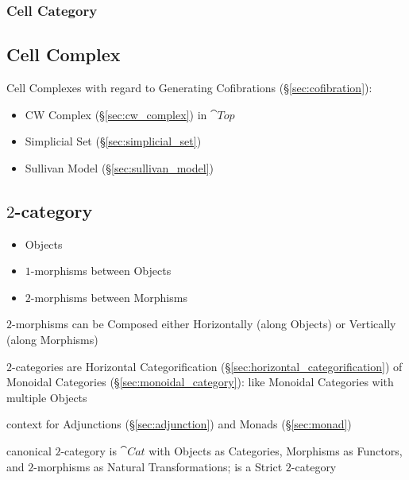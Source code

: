 \subsubsection{Cell Category}\label{sec:cell_category}



\subsection{Cell Complex}\label{sec:cell_complex}

Cell Complexes with regard to Generating Cofibrations
(\S\ref{sec:cofibration}):
\begin{itemize}
\item CW Complex (\S\ref{sec:cw_complex}) in $\cat{Top}$
\item Simplicial Set (\S\ref{sec:simplicial_set})
\item Sullivan Model (\S\ref{sec:sullivan_model})
\end{itemize}



\subsection{$2$-category}\label{sec:2_category}

\begin{itemize}
  \item Objects
  \item $1$-morphisms between Objects
  \item $2$-morphisms between Morphisms
\end{itemize}

$2$-morphisms can be Composed either Horizontally (along Objects) or
Vertically (along Morphisms)

$2$-categories are Horizontal Categorification
(\S\ref{sec:horizontal_categorification}) of Monoidal Categories
(\S\ref{sec:monoidal_category}): like Monoidal Categories with
multiple Objects

context for Adjunctions (\S\ref{sec:adjunction}) and Monads
(\S\ref{sec:monad})

canonical $2$-category is $\cat{Cat}$ with Objects as Categories,
Morphisms as Functors, and $2$-morphisms as Natural Transformations;
is a Strict $2$-category

